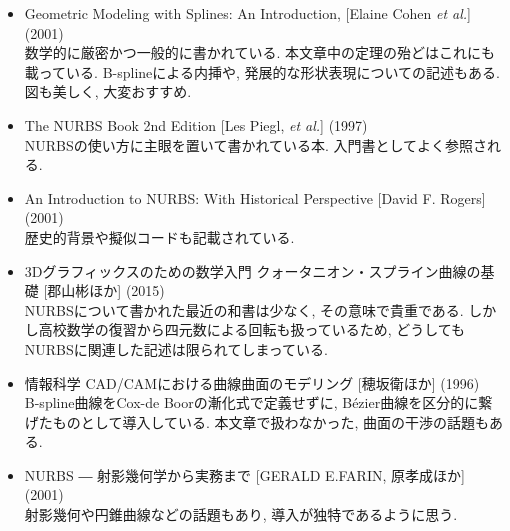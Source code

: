 \documentclass{jsarticle}
\theoremstyle{definition}%
\begin{document}
\begin{itemize}
    \item Geometric Modeling with Splines: An Introduction, [Elaine Cohen \textit{et al.}] (2001) \\
    数学的に厳密かつ一般的に書かれている.
    本文章中の定理の殆どはこれにも載っている.
    B-splineによる内挿や, 発展的な形状表現についての記述もある.
    図も美しく, 大変おすすめ.
    \item The NURBS Book 2nd Edition [Les Piegl, \textit{et al.}] (1997) \\
    NURBSの使い方に主眼を置いて書かれている本. 入門書としてよく参照される.
    \item An Introduction to NURBS: With Historical Perspective [David F. Rogers] (2001) \\
    歴史的背景や擬似コードも記載されている.
    \item 3Dグラフィックスのための数学入門 クォータニオン・スプライン曲線の基礎 [郡山彬ほか] (2015) \\
    NURBSについて書かれた最近の和書は少なく, その意味で貴重である.
    しかし高校数学の復習から四元数による回転も扱っているため, どうしてもNURBSに関連した記述は限られてしまっている.
    \item 情報科学 CAD/CAMにおける曲線曲面のモデリング [穂坂衛ほか] (1996) \\
    B-spline曲線をCox-de Boorの漸化式で定義せずに, B\'{e}zier曲線を区分的に繋げたものとして導入している.
    本文章で扱わなかった, 曲面の干渉の話題もある.
    \item NURBS ― 射影幾何学から実務まで [GERALD E.FARIN, 原孝成ほか] (2001) \\
    射影幾何や円錐曲線などの話題もあり, 導入が独特であるように思う.
\end{itemize}

\end{document}
